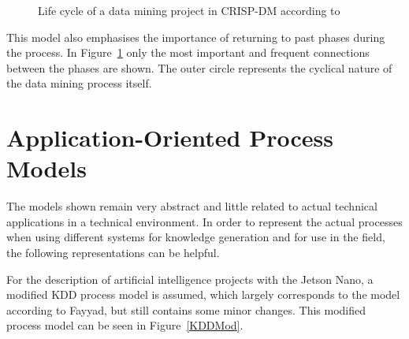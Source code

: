 \begin{figure}[H]
\begin{center}
		\caption{Life cycle of a data mining project in CRISP-DM according to \cite{Chapman:2000}} 
		\label{CRISP-DM}
	\end{center}
\end{figure}

This model also emphasises the importance of returning to past phases during the process. In Figure~\ref{CRISP-DM} only the most important and frequent connections between the phases are shown. The outer circle represents the cyclical nature of the data mining process itself. \cite{Chapman:2000}

\section{Application-Oriented Process Models}

The models shown remain very abstract and little related to actual technical applications in a technical environment. In order to represent the actual processes when using different systems for knowledge generation and for use in the field, the following representations can be helpful.

For the description of artificial intelligence projects with the Jetson Nano, a modified KDD process model is assumed, which largely corresponds to the model according to Fayyad, but still contains some minor changes. This modified process model can be seen in Figure~\ref{KDDMod}.

